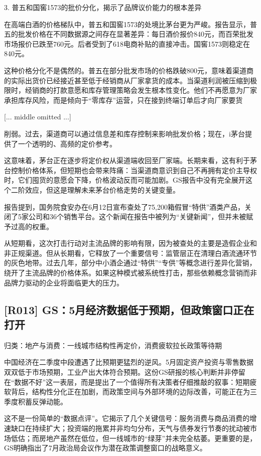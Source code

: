 \documentclass[11pt]{ctexart}
\begin{document}
3. 普五和国窖1573的批价分化，揭示了品牌议价能力的根本差异

在高端白酒的价格梯队中，普五和国窖1573的处境比茅台更为严峻。报告显示，普五的批发价格在不同数据源之间存在显著差异：每日酒价报价840元，而百荣批发市场报价已跌至760元。后者受到了618电商补贴的直接冲击。国窖1573则稳定在840元。

这种价格分化不是偶然的。普五在部分批发市场的价格跌破800元，意味着渠道商的实际出货价已经接近甚至低于经销商从厂家拿货的成本。当渠道利润被压缩到极限时，经销商的打款意愿和库存管理策略会发生根本性变化。他们不再愿意为厂家承担库存风险，而是倾向于“零库存”运营，只在接到终端订单后才向厂家要货

[... middle omitted ...]

削弱。过去，渠道商可以通过信息差和库存控制来影响批发价格；现在，i茅台提供了一个透明的、高频的定价参考。

这意味着，茅台正在逐步将定价权从渠道端收回至厂家端。长期来看，这有利于茅台控制价格体系，但短期也会带来阵痛：当渠道商意识到自己不再拥有定价主导权时，它们囤货的意愿会下降，价格波动反而可能加剧。GS报告中没有完全展开这个二阶效应，但这是理解未来茅台价格走势的关键变量。

报告提到，国务院食安办在6月12日宣布查处了75,200箱假冒“特供”酒类产品，关闭了5家公司和36个销售平台。这个新闻在报告中被列为“关键新闻”，但并未被赋予过高的权重。

从短期看，这次打击行动对主流品牌的影响有限，因为被查处的主要是造假企业和非正规渠道。但从长期看，它释放了一个重要信号：监管层正在清理白酒流通环节的灰色地带。过去几年，部分中小酒企通过“特供”“专供”等概念进行差异化营销，绕开了主流品牌的价格体系。如果这种模式被系统性打击，那些依赖概念营销而非品牌力驱动的企业将面临更大的压力。

\subsection{[R013] GS：5月经济数据低于预期，但政策窗口正在打开}
{\small\color{refgray}归类：地产与消费：一线城市结构性再定价，消费疲软拉长政策等待期}

中国经济在二季度中段遭遇了比预期更猛烈的逆风。5月固定资产投资与零售数据双双低于市场预期，工业产出大体符合预期。这份GS研报的核心判断并非停留在“数据不好”这一表层，而是提出了一个值得所有决策者仔细推敲的叙事：短期疲软背后，结构性分化正在加剧，而政策空间与外部环境的边际改善，可能正在为三季度积蓄反弹动能。

这不是一份简单的“数据点评”。它揭示了几个关键信号：服务消费与商品消费的增速缺口在持续扩大；投资端的拖累并非均匀分布，天气与债券发行节奏的扰动被市场低估；而房地产虽然在低位，但一线城市的“绿芽”并未完全枯萎。更重要的是，GS明确指出了7月政治局会议作为潜在政策调整窗口的战略意义。
\end{document}
